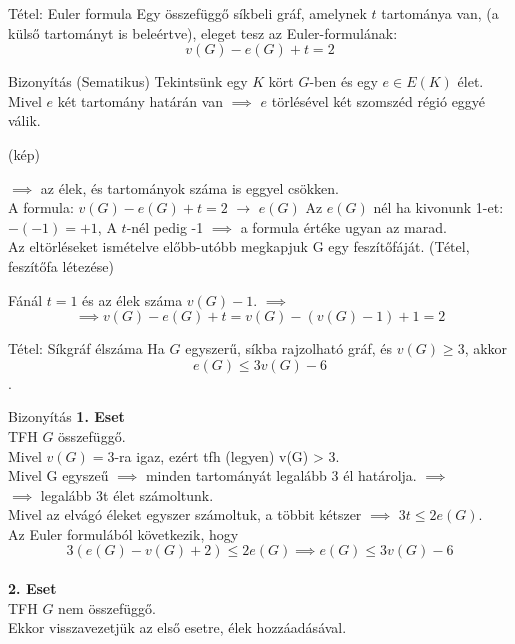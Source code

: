 \documentclass{beamer}
\begin{document}
\begin{frame}

\begin{block}{Tétel: Euler formula}
Egy összefüggő síkbeli gráf, amelynek $t$ tartománya van, (a külső tartományt is beleértve), eleget tesz az Euler-formulának:
$$v(G) - e(G) + t = 2$$

\end{block}

\begin{block}{Bizonyítás (Sematikus)}
Tekintsünk egy $K$ kört $G$-ben és egy $e \in E(K)$ élet.\\
Mivel $e$ két tartomány határán van $\implies$ $e$ törlésével két szomszéd régió eggyé válik.

(kép)

$\implies$ az élek, és tartományok száma is eggyel csökken.\\
A formula: $v(G) - e(G) + t = 2$ $\rightarrow$ $e(G)$ Az $e(G)$ nél ha kivonunk 1-et: $-(-1) = +1$, A $t$-nél pedig -1 $\implies$ a formula értéke ugyan az marad.\\

Az eltörléseket ismételve előbb-utóbb megkapjuk G egy feszítőfáját. (Tétel, feszítőfa létezése)

Fánál $t = 1$ és az élek száma $v(G) - 1$. $\implies$
$$\implies v(G) - e(G) + t = v(G) - (v(G) - 1) + 1 = 2$$

\end{block}
\end{frame}

\begin{frame}
\begin{block}{Tétel: Síkgráf élszáma}
 Ha $G$ egyszerű, síkba rajzolható gráf, és $v(G) \geq 3$, akkor $$e(G) \leq 3v(G) - 6$$.

\end{block}

\begin{block}{Bizonyítás}
\textbf{1. Eset}\\
TFH $G$ összefüggő.\\
Mivel $v(G) = 3$-ra igaz, ezért tfh (legyen) v(G) > 3.\\
Mivel G egyszeű $\implies$ minden tartományát legalább 3 él határolja. $\implies$\\
$\implies$ legalább 3t élet számoltunk.\\
Mivel az elvágó éleket egyszer számoltuk, a többit kétszer $\implies$ $3t \leq 2e(G)$.\\
Az Euler formulából következik, hogy $$3(e(G) - v(G) + 2) \leq 2e(G) \implies e(G) \leq 3v(G) - 6$$\\
\smallskip
\textbf{2. Eset}\\
TFH $G$ nem összefüggő.\\
Ekkor visszavezetjük az első esetre, élek hozzáadásával.

\end{block}

\end{frame}
\end{document}
